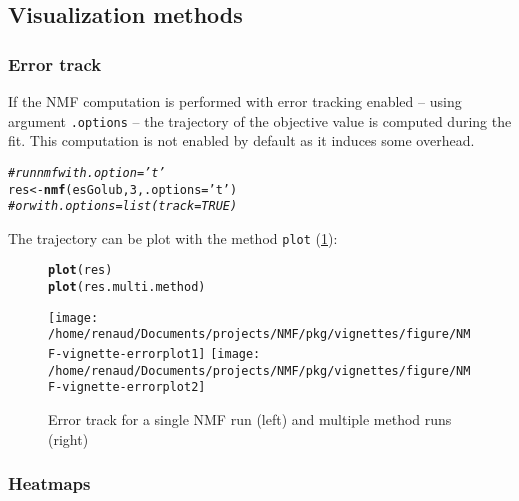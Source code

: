 \documentclass[a4paper]{article}\usepackage[]{graphicx}\usepackage[]{color}
\makeatletter
\newcommand{\hlnum}[1]{\textcolor[rgb]{0.686,0.059,0.569}{#1}}%
\newcommand{\hlstr}[1]{\textcolor[rgb]{0.192,0.494,0.8}{#1}}%
\newcommand{\hlcom}[1]{\textcolor[rgb]{0.678,0.584,0.686}{\textit{#1}}}%
\newcommand{\hlstd}[1]{\textcolor[rgb]{0.345,0.345,0.345}{#1}}%
\newcommand{\hlkwb}[1]{\textcolor[rgb]{0.69,0.353,0.396}{#1}}%
\newcommand{\hlkwc}[1]{\textcolor[rgb]{0.333,0.667,0.333}{#1}}%
\newcommand{\hlkwd}[1]{\textcolor[rgb]{0.737,0.353,0.396}{\textbf{#1}}}%
\newenvironment{kframe}{%
 \def\at@end@of@kframe{}%
 \ifinner\ifhmode%
  \def\at@end@of@kframe{\end{minipage}}%
  \begin{minipage}{\columnwidth}%
 \fi\fi%
 \def\FrameCommand##1{\hskip\@totalleftmargin \hskip-\fboxsep
 \colorbox{shadecolor}{##1}\hskip-\fboxsep
     \hskip-\linewidth \hskip-\@totalleftmargin \hskip\columnwidth}%
 \MakeFramed {\advance\hsize-\width
   \@totalleftmargin\z@ \linewidth\hsize
   \@setminipage}}%
 {\par\unskip\endMakeFramed%
 \at@end@of@kframe}
\newenvironment{knitrout}{}{} %
\let\code=\texttt
\makeatother
\begin{document}
\subsection{Visualization methods}

\subsubsection*{Error track}

If the NMF computation is performed with error tracking enabled -- using argument \code{.options} -- the trajectory of the objective value is computed during the fit.
This computation is not enabled by default as it induces some overhead. 

\begin{knitrout}
\color{fgcolor}\begin{kframe}
\begin{alltt}
\hlcom{# run nmf with .option='t'}
\hlstd{res} \hlkwb{<-} \hlkwd{nmf}\hlstd{(esGolub,} \hlnum{3}\hlstd{,} \hlkwc{.options}\hlstd{=}\hlstr{'t'}\hlstd{)}
\hlcom{# or with .options=list(track=TRUE)}
\end{alltt}
\end{kframe}
\end{knitrout}

The trajectory can be plot with the method \code{plot} (\cref{fig:errorplot}):
\begin{figure}[!htbp]
\begin{knitrout}
\color{fgcolor}\begin{kframe}
\begin{alltt}
\hlkwd{plot}\hlstd{(res)}
\hlkwd{plot}\hlstd{(res.multi.method)}
\end{alltt}
\end{kframe}
\texttt{[image: /home/renaud/Documents/projects/NMF/pkg/vignettes/figure/NMF-vignette-errorplot1]} 
\texttt{[image: /home/renaud/Documents/projects/NMF/pkg/vignettes/figure/NMF-vignette-errorplot2]} 

\end{knitrout}
\caption{Error track for a single NMF run (left) and multiple method
runs (right)}
\label{fig:errorplot}
\end{figure}

\subsubsection*{Heatmaps}
\end{document}
